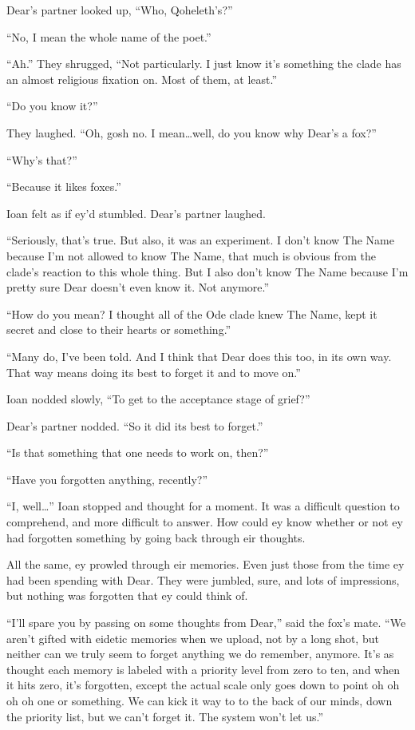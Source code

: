 Dear's partner looked up, ``Who, Qoheleth's?''

``No, I mean the whole name of the poet.''

``Ah.'' They shrugged, ``Not particularly. I just know it's something the clade has an almost religious fixation on. Most of them, at least.''

``Do you know it?''

They laughed. ``Oh, gosh no. I mean\ldots{}well, do you know why Dear's a fox?''

``Why's that?''

``Because it likes foxes.''

Ioan felt as if ey'd stumbled. Dear's partner laughed.

``Seriously, that's true. But also, it was an experiment. I don't know The Name because I'm not allowed to know The Name, that much is obvious from the clade's reaction to this whole thing. But I also don't know The Name because I'm pretty sure Dear doesn't even know it. Not anymore.''

``How do you mean? I thought all of the Ode clade knew The Name, kept it secret and close to their hearts or something.''

``Many do, I've been told. And I think that Dear does this too, in its own way. That way means doing its best to forget it and to move on.''

Ioan nodded slowly, ``To get to the acceptance stage of grief?''

Dear's partner nodded. ``So it did its best to forget.''

``Is that something that one needs to work on, then?''

``Have you forgotten anything, recently?''

``I, well\ldots{}'' Ioan stopped and thought for a moment. It was a difficult question to comprehend, and more difficult to answer. How could ey know whether or not ey had forgotten something by going back through eir thoughts.

All the same, ey prowled through eir memories. Even just those from the time ey had been spending with Dear. They were jumbled, sure, and lots of impressions, but nothing was forgotten that ey could think of.

``I'll spare you by passing on some thoughts from Dear,'' said the fox's mate. ``We aren't gifted with eidetic memories when we upload, not by a long shot, but neither can we truly seem to forget anything we do remember, anymore. It's as thought each memory is labeled with a priority level from zero to ten, and when it hits zero, it's forgotten, except the actual scale only goes down to point oh oh oh oh one or something. We can kick it way to to the back of our minds, down the priority list, but we can't forget it. The system won't let us.''

